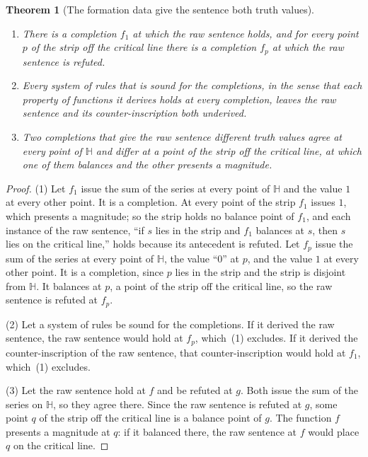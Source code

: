 \documentclass[11pt]{article}
\newtheorem{theorem}{Theorem}[section]
\theoremstyle{definition}
\theoremstyle{remark}
\newcommand{\Hp}{\mathbb H}
\begin{document}
\begin{theorem}[The formation data give the sentence both truth values]\label{thm:both}
\leavevmode
\begin{enumerate}[leftmargin=2em,itemsep=1pt]
\item There is a completion $f_1$ at which the raw sentence holds, and for every point $p$ of the strip off the critical line there is a completion $f_p$ at which the raw sentence is refuted.
\item Every system of rules that is sound for the completions, in the sense that each property of functions it derives holds at every completion, leaves the raw sentence and its counter-inscription both underived.
\item Two completions that give the raw sentence different truth values agree at every point of $\Hp$ and differ at a point of the strip off the critical line, at which one of them balances and the other presents a magnitude.
\end{enumerate}
\end{theorem}

\begin{proof}
(1) Let $f_1$ issue the sum of the series at every point of $\Hp$ and the value $1$ at every other point. It is a completion. At every point of the strip $f_1$ issues $1$, which presents a magnitude; so the strip holds no balance point of $f_1$, and each instance of the raw sentence, ``if $s$ lies in the strip and $f_1$ balances at $s$, then $s$ lies on the critical line,'' holds because its antecedent is refuted. Let $f_p$ issue the sum of the series at every point of $\Hp$, the value ``0'' at $p$, and the value $1$ at every other point. It is a completion, since $p$ lies in the strip and the strip is disjoint from $\Hp$. It balances at $p$, a point of the strip off the critical line, so the raw sentence is refuted at $f_p$.

(2) Let a system of rules be sound for the completions. If it derived the raw sentence, the raw sentence would hold at $f_p$, which~(1) excludes. If it derived the counter-inscription of the raw sentence, that counter-inscription would hold at $f_1$, which~(1) excludes.

(3) Let the raw sentence hold at $f$ and be refuted at $g$. Both issue the sum of the series on $\Hp$, so they agree there. Since the raw sentence is refuted at $g$, some point $q$ of the strip off the critical line is a balance point of $g$. The function $f$ presents a magnitude at $q$: if it balanced there, the raw sentence at $f$ would place $q$ on the critical line.
\end{proof}
\end{document}
